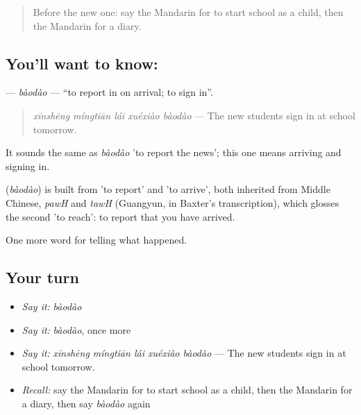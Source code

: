 \label{lesson:ZH-C304-baodao-register}



\begin{quote}
Before the new one: say the Mandarin for to start school as a child, then the Mandarin for a diary.
\end{quote}

\subsection*{You'll want to know: }
\textbf{} — \emph{bàodào} — \textquotedblleft{}to report in on arrival; to sign in\textquotedblright{}.

\begin{quote}
\textbf{} \emph{xīnshēng míngtiān lái xuéxiào bàodào} — The new students sign in at school tomorrow.
\end{quote}

It sounds the same as \emph{bàodào} 'to report the news'; this one means arriving and signing in.

\begin{cousinweb}
\textbf{} (\emph{bàodào}) is built from  'to report' and  'to arrive', both inherited from Middle Chinese, \emph{pawH} and \emph{tawH} (Guangyun, in Baxter's transcription), which glosses the second 'to reach': to report that you have arrived.
\end{cousinweb}

\begin{grammarlens}[title={What you've built}]
One more word for telling what happened.
\end{grammarlens}

\subsection*{Your turn}
\begin{itemize}
\raggedright
  \item \emph{Say it:} \emph{bàodào}
  \item \emph{Say it:} \emph{bàodào}, once more
  \item \emph{Say it:} \emph{xīnshēng míngtiān lái xuéxiào bàodào} — The new students sign in at school tomorrow.
  \item \emph{Recall:} say the Mandarin for to start school as a child, then the Mandarin for a diary, then say \emph{bàodào} again
\end{itemize}

